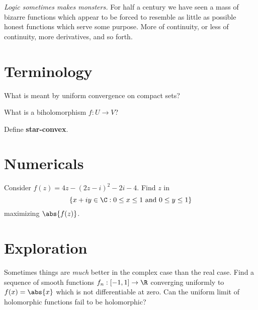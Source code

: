 \documentclass{homework}
\author{Jim Fowler}
\begin{document}
\maketitle

\begin{inspiration}
  \textit{Logic sometimes makes monsters.} For half a century we have
  seen a mass of bizarre functions which appear to be forced to
  resemble as little as possible honest functions which serve some
  purpose. More of continuity, or less of continuity, more
  derivatives, and so forth.
\end{inspiration}

\section{Terminology}

\begin{problem}
  What is meant by uniform convergence on compact sets?
\end{problem}

\begin{problem}
  What is a biholomorphism $f : U \to V$?
\end{problem}

\begin{problem}
  Define \textbf{star-convex}.
\end{problem}

\section{Numericals}

\begin{problem}\label{max-modulus-numerical}
  Consider $f(z) = 4z - (2z - i)^2 - 2i - 4$.  Find $z$ in 
  \[
    \{ x + iy \in \C : 0 \leq x \leq 1 \mbox{ and } 0 \leq y \leq 1 \}
  \]
  maximizing $\abs{f(z)}$.
\end{problem}

\section{Exploration}

\begin{problem}
  Sometimes things are \textit{much} better in the complex case than
  the real case.  Find a sequence of smooth functions
  $f_n : [-1,1] \to \R$ converging uniformly to $f(x) = \abs{x}$ which
  is not differentiable at zero.  Can the uniform limit of holomorphic
  functions fail to be holomorphic?
\end{problem}
\end{document}
